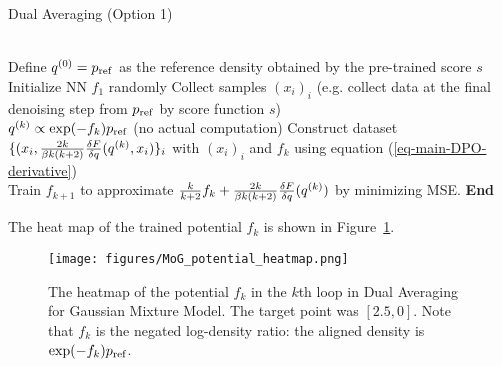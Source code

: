 \begin{algorithm}[htbp]
\label{alg:DA-train-f}
\caption{Dual Averaging (Option 1)}
\begin{algorithmic}
    \\
    \STATE Define $q^{(0)}=p_{\rm{ref}}$ as the reference density obtained by the pre-trained score $s$ 
    \STATE Initialize NN $f_1$ randomly
    \STATE Collect samples $(x_i)_i$ (e.g. collect data at the final denoising step from $p_{\rm{ref}}$ by score function $s$)\\
        \STATE $q^{(k)} \propto \exp(-f_k)p_{\rm{ref}}$ (no actual computation)
        \STATE Construct dataset $\lbrace (x_i, \frac{2k}{\beta k(k+2)}\frac{\delta F}{\delta q}(q^{(k)},x_i)\rbrace_i$ with $(x_i)_i$ and $f_k$ using equation (\ref{eq-main-DPO-derivative})\\
        \STATE Train $f_{k+1}$ to approximate $\frac{k}{k+2}f_{k} + \frac{2k}{\beta k(k+2)}\frac{\delta F}{\delta q}(q^{(k)})$ by minimizing MSE.
    \ENDFOR
    \STATE \textbf{End}
\end{algorithmic}
\end{algorithm}

The heat map of the trained potential $f_k$ is shown in Figure~\ref{fig:MoG-heatmap}.

\begin{figure}[htbp]
    \centering
    \texttt{[image: figures/MoG\_potential\_heatmap.png]}
    \caption{The heatmap of the potential $f_k$ in the $k$th loop in Dual Averaging for Gaussian Mixture Model. The target point was $[2.5,0]$. Note that $f_k$ is the negated log-density ratio: the aligned density is $\exp(-f_k)p_{\rm{ref}}$.}
    \label{fig:MoG-heatmap}
\end{figure}

